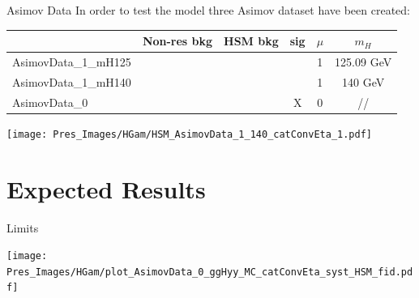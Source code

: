 \documentclass[10pt,UKenglish, leqno, xcolor = dvipsnames]{beamer}
\begin{document}
	\begin{frame}{Asimov Data}
		\vfill
		In order to test the model three Asimov dataset have been created:
		\begin{center}
			\begin{table}[tbp]
				\centering
				\begin{tabular}{lccccc}
					\toprule[1.pt]
											& Non-res bkg	& HSM bkg		& sig			& $\mu$	& $m_H$		\\
					\midrule
					AsimovData\_1\_mH125	& \checkmark	& \checkmark	& \checkmark	& 1		& 125.09 GeV	\\
					AsimovData\_1\_mH140	& \checkmark	& \checkmark	& \checkmark	& 1		& 140 GeV		\\
					AsimovData\_0			& \checkmark	& \checkmark	& X				& 0		& //		\\
					\bottomrule[1.pt]
				\end{tabular}
			\end{table}
		
		\texttt{[image: Pres\_Images/HGam/HSM\_AsimovData\_1\_140\_catConvEta\_1.pdf]}
		\end{center}
		\vfill
	\end{frame}
	
	\section{Expected Results}
	\SectionPage
	
	\begin{frame}{Limits}
		\vfill
		\begin{center}
			\texttt{[image: Pres\_Images/HGam/plot\_AsimovData\_0\_ggHyy\_MC\_catConvEta\_syst\_HSM\_fid.pdf]}\\
		\end{center}
		\vfill
	\end{frame}
	
	
\end{document}
